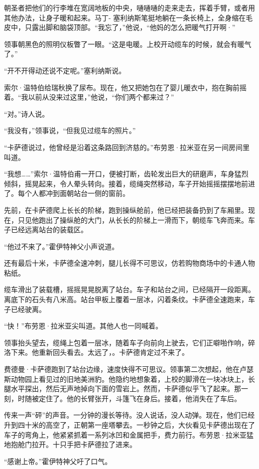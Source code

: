 \documentclass[AutoFakeBold=true]{book}
\begin{document}
朝圣者把他们的行李堆在宽阔地板的中央，嗵嗵嗵的走来走去，挥着手臂，或者用其他办法，让身子暖和起来。马丁- 塞利纳斯笔挺地躺在一条长椅上，全身缩在毛皮中，只露出脚和脑袋顶部。``我忘了，''他说，``他妈的怎么把暖气打开啊·''

领事朝黑色的照明仪板瞥了一眼。``这是电暖。上校开动缆车的时候，就会有暖气了。''

``开不开得动还说不定呢。''塞利纳斯说。

索尔·温特伯给瑞秋换了尿布。现在，他又把她包在了婴儿暖衣中，抱在胸前摇着。``我以前从没来过这里，''他说，``你们两个都来过？''

``对。''诗人说。

``我没有，''领事说，``但我见过缆车的照片。''

``卡萨德说过，他曾经是沿着这条路回到济慈的。''布劳恩·拉米亚在另一间房间里叫道。

``我想……''索尔·温特伯甫一开口，便被打断，齿轮发出巨大的研磨声，车身猛烈倾斜，摇晃起来，令人晕头转向。接着，缆绳突然移动，车子开始摇摇摆摆地前进了。每个人都冲到面朝站台一侧的窗前。

先前，在卡萨德爬上长长的阶梯，跑到操纵舱前，他已经把装备扔到了车厢里。现在，只见他跑出了操纵舱的大门，从长长的阶梯上一滑而下，朝缆车飞奔而来。车子已经远离站台的装载区。

``他过不来了。''霍伊特神父小声说道。

还有最后十米，卡萨德全速冲刺，腿儿长得不可思议，仿若购物商场中的卡通人物粘纸。

缆车滑出了装载槽，摇摇晃晃脱离了站台。车子和站台之间，已经隔开一段距离。离底下的石头有八米高。站台甲板上覆着一层冰，闪着条纹。卡萨德全速跑来，车子已经驶离。

``快！''布劳恩·拉米亚尖叫道。其他人也一同喊着。

领事抬头望去，缆绳上包着一层冰，随着车子向前向上驶去，它们正噼啪作响，碎洛下来。他重新回头看去。太远了，。卡萨德肯定过不来了。

费德曼·卡萨德跑到了站台边缘，速度快得不可思议。领事第二次想起，他在卢瑟斯动物园上看见过的旧地美洲豹。他隐约地想象着，上校的脚滑在一块冰块上，长腿水平探出，然后无声地掉向下面的雪岩上。然而，卡萨德似乎飞了起来。那一刻，时随被定住了。他的长臂张开，斗篷飞在身后。接着，他消失在了车后。

传来一声``砰''的声音。一分钟的漫长等待。没人说话，没人动弹。现在，他们已经升到四十米的高空了，正朝第一座塔攀去。一秒钟之后，大伙看见卡萨德出现在了车子的弯角上，他紧紧抓着一系列冰凹和金属把手，费力前行。布劳恩·拉米亚猛地抱舱门拉开。十只手把卡萨德拉了进来。

``感谢上帝。''霍伊特神父吁了口气。
\end{document}
